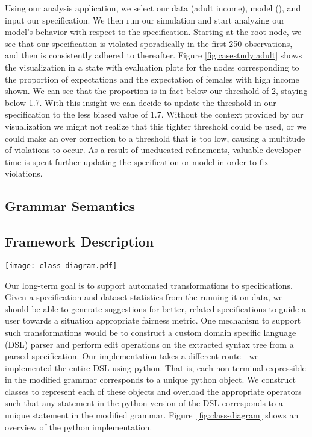Using our analysis application, we select our data (adult income), model (), and input our specification.
We then run our simulation and start analyzing our model's behavior with respect to the specification.
Starting at the root node, we see that our specification is violated sporadically in the first 250 observations, and then is consistently adhered to thereafter.
Figure \ref{fig:casestudy:adult} shows the visualization in a state with evaluation plots for the nodes corresponding to the proportion of expectations and the expectation of females with high income shown.
We can see that the proportion is in fact below our threshold of 2, staying below 1.7.
With this insight we can decide to update the threshold in our specification to the less biased value of 1.7.
Without the context provided by our visualization we might not realize that this tighter threshold could be used, or we could make an over correction to a threshold that is too low, causing a multitude of violations to occur.
As a result of uneducated refinements, valuable developer time is spent further updating the specification or model in order to fix violations.

 \subsection{Grammar Semantics}
 
\subsection{Framework Description}
\label{sec:implementation:framework}
\begin{figure*}
    \centering
    \texttt{[image: class-diagram.pdf]}
    \caption{Diagram for the internal class structure of implementation}
    \label{fig:class-diagram}
\end{figure*}

Our long-term goal is to support automated transformations to specifications.
Given a specification and dataset statistics from the running it on data, we should be able to generate suggestions for better, related specifications to guide a user towards a situation appropriate fairness metric. 
One mechanism to support such transformations would be to construct a custom domain specific language (DSL) parser and perform edit operations on the extracted syntax tree from a parsed specification.
Our implementation takes a different route - we implemented the entire DSL using python. 
That is, each non-terminal expressible in the modified grammar corresponds to a unique python object. 
We construct classes to represent each of these objects and overload the appropriate operators such that any statement in the python version of the DSL corresponds to a unique statement in the modified grammar. 
Figure~\ref{fig:class-diagram} shows an overview of the python implementation. 

